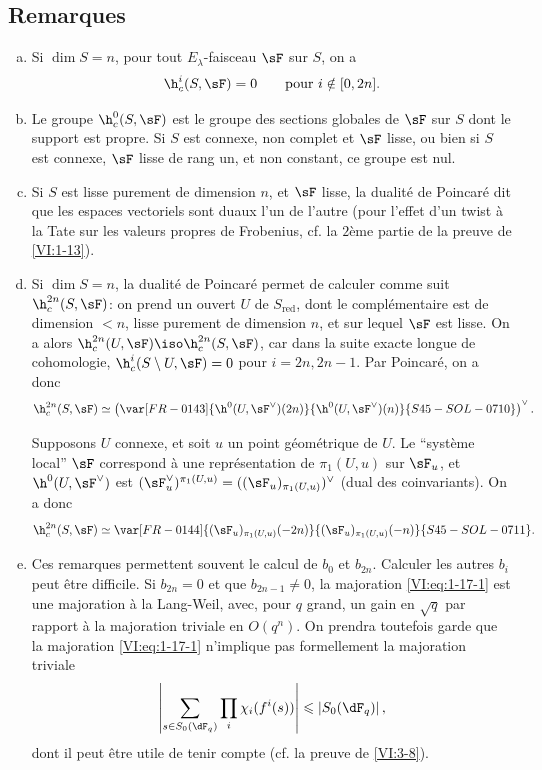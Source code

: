 \subsection{Remarques}\label{VI:1-18}

\begin{enumerate}[a)]
  \item Si $\dim S=n$, pour tout $E_\lambda$-faisceau $\sF$ sur $S$, on a 
    \[
      \h_c^i(S,\sF) = 0 \qquad \text{pour $i\notin [0,2n]$.}
    \]
  \item Le groupe $\h_c^0(S,\sF)$ est le groupe des sections globales de $\sF$ 
    sur $S$ dont le support est propre. Si $S$ est connexe, non complet et 
    $\sF$ lisse, ou bien si $S$ est connexe, $\sF$ lisse de rang un, et non 
    constant, ce groupe est nul.
  \item Si $S$ est lisse purement de dimension $n$, et $\sF$ lisse, la 
    dualité de Poincaré dit que les espaces vectoriels 
     sont duaux l'un de l'autre 
    (pour l'effet d'un twist à la Tate sur les valeurs propres de Frobenius, 
    cf. la $2$ème partie de la preuve de \ref{VI:1-13}).
  \item Si $\dim S=n$, la dualité de Poincaré permet de calculer comme 
    suit $\h_c^{2n}(S,\sF)$: on prend un ouvert $U$ de $S_\text{red}$, dont le 
    complémentaire est de dimension $<n$, lisse purement de dimension $n$, et 
    sur lequel $\sF$ est lisse. On a alors 
    $\h_c^{2n}(U,\sF) \iso \h_c^{2n}(S,\sF)$, car dans la suite exacte longue 
    de cohomologie, $\h_c^i(S\setminus U,\sF) = 0$ pour $i=2n,2n-1$. Par 
    Poincaré, on a donc 
    \[
      \h_c^{2n}(S,\sF) \simeq \left(\var[FR-0143]{\h^0(U,\sF^\vee)(2n)}{\h^0(U,\sF^\vee)(n)}{S45-SOL-0710}\right)^\vee \text{.}
    \]
    
    Supposons $U$ connexe, et soit $u$ un point géométrique de $U$. Le 
    ``système local'' $\sF$ correspond à une représentation de 
    $\pi_1(U,u)$ sur $\sF_u$, et $\h^0(U,\sF^\vee)$ est 
    $(\sF_u^\vee)^{\pi_1(U,u)}=((\sF_u)_{\pi_1(U,u)})^\vee$ (dual des 
    coinvariants). On a donc 
\[
      \h_c^{2n}(S,\sF) \simeq \var[FR-0144]{(\sF_u)_{\pi_1(U,u)}(-2n)}{(\sF_u)_{\pi_1(U,u)}(-n)}{S45-SOL-0711} \text{.}
    \]
  \item Ces remarques permettent souvent le calcul de $b_0$ et $b_{2n}$. 
    Calculer les autres $b_i$ peut être difficile. Si $b_{2n}=0$ et que 
    $b_{2n-1}\ne 0$, la majoration \eqref{VI:eq:1-17-1} est une majoration à la 
    Lang-Weil, avec, pour $q$ grand, un gain en $\sqrt q$ par rapport à la 
    majoration triviale en $O(q^n)$. On prendra toutefois garde que la 
    majoration \eqref{VI:eq:1-17-1} n'implique pas formellement la majoration 
    triviale 
    \[
      \left|\sum_{s\in S_0(\dF_q)} \prod_i \chi_i(f^i(s))\right| \leqslant \left| S_0(\dF_q)\right| \text{,}
    \]
    dont il peut être utile de tenir compte (cf. la preuve de \ref{VI:3-8}). 
\end{enumerate}

